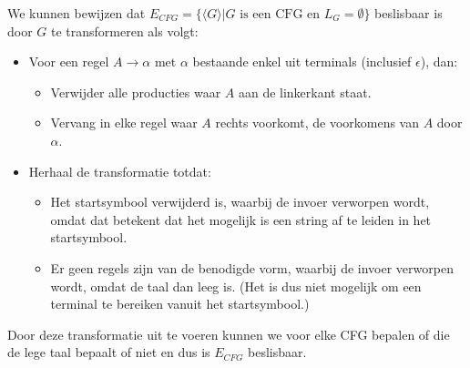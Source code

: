   We kunnen bewijzen dat $E_{CFG} = \{\langle G \rangle | G \text{ is een CFG en } L_G = \emptyset\}$ beslisbaar is door $G$ te transformeren als volgt:
  \begin{itemize}
  \item Voor een regel $A \rightarrow \alpha$ met $\alpha$ bestaande enkel uit terminals (inclusief $\epsilon$), dan:
  \begin{itemize}
  \item Verwijder alle producties waar $A$ aan de linkerkant staat.
  \item Vervang in elke regel waar $A$ rechts voorkomt, de voorkomens van $A$ door $\alpha$.
  \end{itemize}
  \item Herhaal de transformatie totdat:
  \begin{itemize}
  \item Het startsymbool verwijderd is, waarbij de invoer verworpen wordt, omdat dat betekent dat het mogelijk is een string af te leiden in het startsymbool.
  \item Er geen regels zijn van de benodigde vorm, waarbij de invoer verworpen wordt, omdat de taal dan leeg is. (Het is dus niet mogelijk om een terminal te bereiken vanuit het startsymbool.)
  \end{itemize}
  \end{itemize}
  Door deze transformatie uit te voeren kunnen we voor elke CFG bepalen of die de lege taal bepaalt of niet en dus is $E_{CFG}$ beslisbaar.